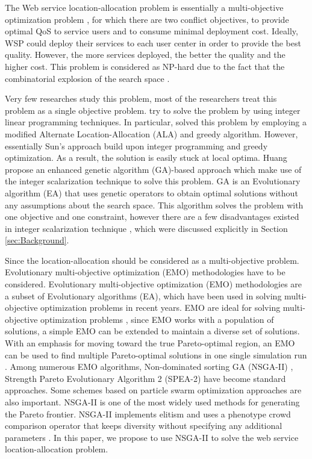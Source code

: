 \documentclass{llncs}
\begin{document}
The Web service location-allocation problem is essentially a multi-objective optimization problem \cite{Multiobjective}, for which there are two conflict objectives, to provide optimal 
QoS to service users and to consume minimal deployment cost.
Ideally, WSP could deploy their services to each user center in order to provide the best quality.
However, the more services deployed, the better the quality and the higher cost. 
This problem is considered as NP-hard due to the fact that the combinatorial explosion of the search space \cite{Vanrompay}. 


Very few researches study this problem, most of the researchers treat this problem as a single objective problem.
\cite{Aboolian} \cite{Sun} try to solve the problem by using integer linear programming techniques.
In particular, \cite{Sun} solved this problem by employing a modified Alternate Location-Allocation (ALA) and greedy algorithm. 
However, essentially Sun's approach build upon integer programming and greedy optimization. 
As a result, the solution is easily stuck at local optima.
Huang \cite{EnhancedGenetic} propose an enhanced genetic algorithm (GA)-based approach which make use of the integer scalarization technique to solve this problem.
GA \cite{man1996genetic} is an Evolutionary algorithm (EA) that uses genetic operators to obtain optimal solutions without any assumptions about the search space.
This algorithm solves the problem with one objective and one constraint, however there are a few disadvantages existed in
integer scalarization technique \cite{Multiobjective}, which were discussed explicitly in Section \ref{sec:Background}.

Since the location-allocation should be considered as a multi-objective problem. Evolutionary multi-objective optimization (EMO) methodologies have to be considered.
Evolutionary multi-objective optimization (EMO) methodologies are a subset of Evolutionary algorithms (EA), which have been used in solving multi-objective optimization problems in recent years. 
EMO are ideal for solving multi-objective optimization problems \cite{key:article}, since EMO works with a population of solutions, 
a simple EMO can be extended to maintain a diverse set of solutions.
With an emphasis for moving toward the true Pareto-optimal region, an EMO can be used to find multiple Pareto-optimal solutions in 
one single simulation run \cite{OptimizationElectrical}. Among numerous EMO algorithms,
Non-dominated sorting GA (NSGA-II) \cite{996017}, Strength Pareto Evolutionary Algorithm 2 (SPEA-2) \cite{Deb} have become standard approaches. 
Some schemes based on particle swarm optimization approaches \cite{Elhossini} \cite{Huang} are also important. 
NSGA-II is one of the most widely used methods for generating the Pareto frontier. 
NSGA-II implements elitism and uses a phenotype crowd comparison operator that keeps diversity without specifying any additional parameters \cite{Deb06referencepoint}.
In this paper, we propose to use NSGA-II to solve the web service location-allocation problem.
\end{document}

